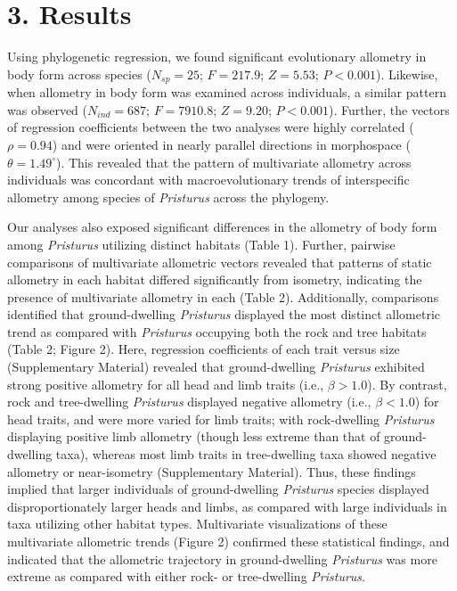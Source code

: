 \documentclass[
  11pt,
]{article}
\begin{document}
\hypertarget{results}{%
\section{3. Results}\label{results}}

Using phylogenetic regression, we found significant evolutionary
allometry in body form across species (\(N_{sp}=25\); \(F = 217.9\);
\(Z =5.53\); \(P < 0.001\)). Likewise, when allometry in body form was
examined across individuals, a similar pattern was observed
(\(N_{ind}=687\); \(F = 7910.8\); \(Z =9.20\); \(P < 0.001\)). Further,
the vectors of regression coefficients between the two analyses were
highly correlated (\(\rho = 0.94\)) and were oriented in nearly parallel
directions in morphospace (\(\theta = 1.49^\circ\)). This revealed that
the pattern of multivariate allometry across individuals was concordant
with macroevolutionary trends of interspecific allometry among species
of \emph{Pristurus} across the phylogeny. \hfill\break

Our analyses also exposed significant differences in the allometry of
body form among \emph{Pristurus} utilizing distinct habitats (Table 1).
Further, pairwise comparisons of multivariate allometric vectors
revealed that patterns of static allometry in each habitat differed
significantly from isometry, indicating the presence of multivariate
allometry in each (Table 2). Additionally, comparisons identified that
ground-dwelling \emph{Pristurus} displayed the most distinct allometric
trend as compared with \emph{Pristurus} occupying both the rock and tree
habitats (Table 2; Figure 2). Here, regression coefficients of each
trait versus size (Supplementary Material) revealed that ground-dwelling
\emph{Pristurus} exhibited strong positive allometry for all head and
limb traits (i.e., \(\beta>1.0\)). By contrast, rock and tree-dwelling
\emph{Pristurus} displayed negative allometry (i.e., \(\beta < 1.0\))
for head traits, and were more varied for limb traits; with
rock-dwelling \emph{Pristurus} displaying positive limb allometry
(though less extreme than that of ground-dwelling taxa), whereas most
limb traits in tree-dwelling taxa showed negative allometry or
near-isometry (Supplementary Material). Thus, these findings implied
that larger individuals of ground-dwelling \emph{Pristurus} species
displayed disproportionately larger heads and limbs, as compared with
large individuals in taxa utilizing other habitat types. Multivariate
visualizations of these multivariate allometric trends (Figure 2)
confirmed these statistical findings, and indicated that the allometric
trajectory in ground-dwelling \emph{Pristurus} was more extreme as
compared with either rock- or tree-dwelling \emph{Pristurus}.
\hfill\break
\end{document}
